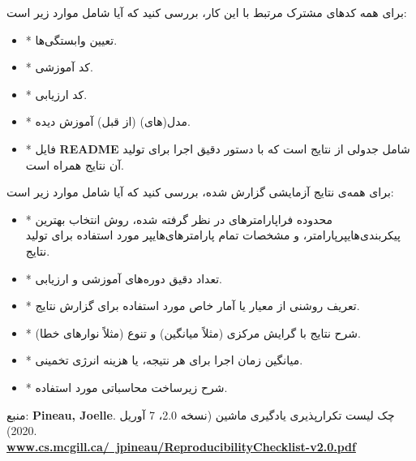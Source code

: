 \begin{tcolorbox}[colback=gray!10,colframe=black,breakable]
    برای همه کدهای مشترک مرتبط با این کار، بررسی کنید که آیا شامل موارد زیر است:
    \begin{itemize}[itemsep=0.2ex]
        \item * تعیین وابستگی‌ها.
        \item * کد آموزشی.
        \item * کد ارزیابی.
        \item * مدل(های) (از قبل) آموزش دیده.
        \item * فایل \textenglish{\textbf{README}} شامل جدولی از نتایج است که با دستور دقیق اجرا برای تولید آن نتایج همراه است.
        \newline
    \end{itemize}


    برای همه‌ی نتایج آزمایشی گزارش شده، بررسی کنید که آیا شامل موارد زیر است:
    \begin{itemize}[itemsep=0.2ex]
        \item * محدوده فراپارامترهای در نظر گرفته شده، روش انتخاب بهترین پیکربندی‌هایپرپارامتر، و مشخصات تمام پارامترهای‌هایپر مورد استفاده برای تولید نتایج.
        \item * تعداد دقیق دوره‌های آموزشی و ارزیابی.
        \item * تعریف روشنی از معیار یا آمار خاص مورد استفاده برای گزارش نتایج.
        \item * شرح نتایج با گرایش مرکزی (مثلاً میانگین) و تنوع (مثلاً نوارهای خطا).
        \item * میانگین زمان اجرا برای هر نتیجه، یا هزینه انرژی تخمینی.
        \item * شرح زیرساخت محاسباتی مورد استفاده.
        \newline
    \end{itemize}

    منبع: \textenglish{\textbf{Pineau, Joelle}}.
    چک لیست تکرارپذیری یادگیری ماشین (نسخه 2.0، 7 آوریل 2020).
    \\
    \href{https://www.cs.mcgill.ca/~jpineau/ReproducibilityChecklist-v2.0.pdf}{\textenglish{\textbf{www.cs.mcgill.ca/~jpineau/ReproducibilityChecklist-v2.0.pdf}}}
\end{tcolorbox}

